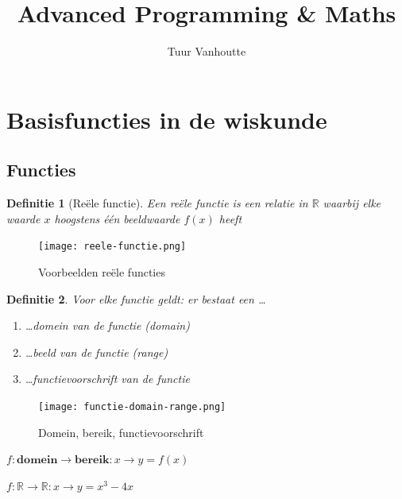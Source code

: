\documentclass{article}
\newtheorem{theorem}{Definitie}[section]
\newenvironment{thmenum}
 {\begin{enumerate}[label=\upshape\bfseries(\roman*)]}
 {\end{enumerate}}
\begin{document}
\begin{titlepage}
    \author{Tuur Vanhoutte}
    \title{Advanced Programming \& Maths}
\end{titlepage}

\maketitle
\newpage
\tableofcontents
\newpage


\section{Basisfuncties in de wiskunde}

\subsection{Functies}

\begin{theorem}[Reële functie]
Een reële functie is een relatie in $\mathbb{R}$ waarbij elke waarde $x$ hoogstens één beeldwaarde $f(x)$ heeft
\end{theorem}

\begin{figure}[H]
    \centering
    \texttt{[image: reele-functie.png]}
    \caption{Voorbeelden reële functies}
\end{figure}

\begin{theorem}
Voor elke functie geldt: er bestaat een \dots
    \begin{thmenum}
        \item \dots domein van de functie (domain)
        \item \dots beeld van de functie (range)
        \item \dots functievoorschrift van de functie
    \end{thmenum}
\end{theorem}

\begin{figure}[H]
    \centering
    \texttt{[image: functie-domain-range.png]}
    \caption{Domein, bereik, functievoorschrift}
\end{figure}

$f: \mathbf{domein} \rightarrow \mathbf{bereik}: x \rightarrow y = f(x)$

$f: \mathbb{R} \rightarrow \mathbb{R} : x \rightarrow y = x^3 - 4x$
\end{document}
